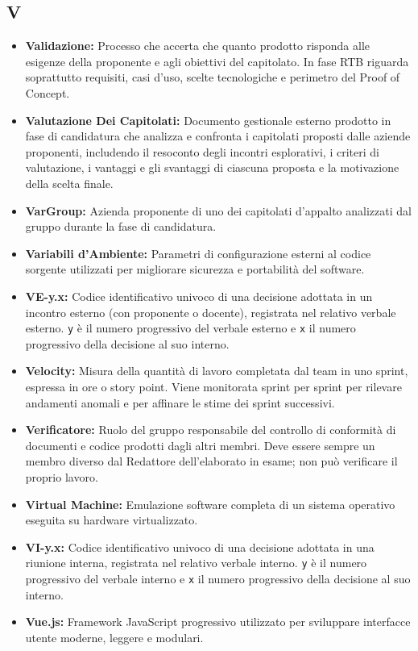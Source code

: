 {}
\subsection*{V}
\begin{itemize}[leftmargin=*]
      \item \textbf{Validazione:} Processo che accerta che quanto prodotto risponda alle esigenze della proponente e agli obiettivi del capitolato. In fase RTB riguarda soprattutto requisiti, casi d'uso, scelte tecnologiche e perimetro del Proof of Concept.
      \item \textbf{Valutazione Dei Capitolati:} Documento gestionale esterno prodotto
          in fase di candidatura che analizza e confronta i capitolati proposti
          dalle aziende proponenti, includendo il resoconto degli incontri
          esplorativi, i criteri di valutazione, i vantaggi e gli svantaggi di
          ciascuna proposta e la motivazione della scelta finale.
      \item \textbf{VarGroup:} Azienda proponente di uno dei capitolati d'appalto analizzati dal gruppo durante la fase di candidatura.
      \item \textbf{Variabili d’Ambiente:} Parametri di configurazione esterni al codice sorgente utilizzati per migliorare sicurezza e portabilità del software.
      \item \textbf{VE-y.x:} Codice identificativo univoco di una decisione adottata
          in un incontro esterno (con proponente o docente), registrata nel relativo
          verbale esterno. \texttt{y} è il numero progressivo del verbale esterno
          e \texttt{x} il numero progressivo della decisione al suo interno.
      \item \textbf{Velocity:} Misura della quantità di lavoro completata dal team in uno
      sprint, espressa in ore o story point. Viene monitorata sprint
      per sprint per rilevare andamenti anomali e per affinare le stime dei sprint
      successivi.
      \item \textbf{Verificatore:} Ruolo del gruppo responsabile del controllo di
          conformità di documenti e codice prodotti dagli altri membri. Deve essere
          sempre un membro diverso dal Redattore dell'elaborato in esame; non può
          verificare il proprio lavoro.
      \item \textbf{Virtual Machine:} Emulazione software completa di un sistema operativo eseguita su hardware virtualizzato.
      \item \textbf{VI-y.x:} Codice identificativo univoco di una decisione adottata
          in una riunione interna, registrata nel relativo verbale interno.
          \texttt{y} è il numero progressivo del verbale interno e \texttt{x} il
          numero progressivo della decisione al suo interno.
      \item \textbf{Vue.js:} Framework JavaScript progressivo utilizzato per sviluppare interfacce utente moderne, leggere e modulari.
\end{itemize}
 
